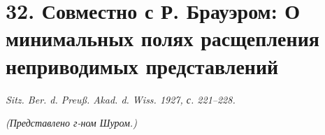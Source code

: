 \documentclass[11pt]{article}
\begin{document}

\setcounter{footnote}{0}

\section*{32. Совместно с Р. Брауэром: О минимальных полях расщепления неприводимых представлений}
\begin{center}
\emph{Sitz. Ber. d. Preuß. Akad. d. Wiss. 1927, с. 221--228.}
\end{center}

\begin{center}\emph{(Представлено г-ном Шуром.)}\end{center}
\end{document}

